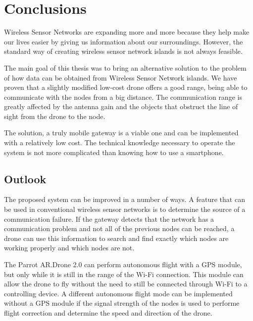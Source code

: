 \chapter{Conclusions}


Wireless Sensor Networks are expanding more and more because they help make our lives easier by giving us information about our surroundings. However, the standard way of creating wireless sensor network islands is not always feasible.

The main goal of this thesis was to bring an alternative solution to the problem of how data can be obtained from Wireless Sensor Network islands. We have proven that a slightly modified low-cost drone offers a good range, being able to communicate with the nodes from a big distance. The communication range is greatly affected by the antenna gain and the objects that obstruct the line of sight from the drone to the node.


The solution, a truly mobile gateway is a viable one and can be implemented with a relatively low cost. The technical knowledge necessary to operate the system is not more complicated than knowing how to use a smartphone.




\section{Outlook}

The proposed system can be improved in a number of ways. A feature that can be used in conventional wireless sensor networks is to determine the source of a communication failure. If the gateway detects that the network has a communication problem and not all of the previous nodes can be reached, a drone can use this information to search and find exactly which nodes are working properly and which nodes are not.

The Parrot AR.Drone 2.0 can perform autonomous flight with a GPS module, but only while it is still in the range of the Wi-Fi connection. This module can allow the drone to fly without the need to still be connected through Wi-Fi to a controlling device. A different autonomous flight mode can be implemented without a GPS module if the signal strength of the nodes is used to performe flight correction and determine the speed and direction of the drone.

